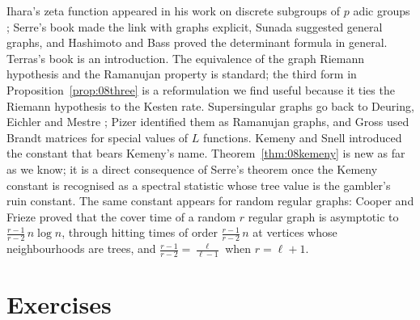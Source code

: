 Ihara's zeta function appeared in his work on discrete subgroups of $p$ adic groups \cite{ihara1966}; Serre's book \cite{serre1980} made the link with graphs explicit, Sunada \cite{sunada1986} suggested general graphs, and Hashimoto \cite{hashimoto1989} and Bass \cite{bass1992} proved the determinant formula in general. Terras's book \cite{terras2011} is an introduction. The equivalence of the graph Riemann hypothesis and the Ramanujan property is standard; the third form in Proposition~\ref{prop:08three} is a reformulation we find useful because it ties the Riemann hypothesis to the Kesten rate. Supersingular graphs go back to Deuring, Eichler and Mestre \cite{mestre1986}; Pizer \cite{pizer1990} identified them as Ramanujan graphs, and Gross \cite{gross1987} used Brandt matrices for special values of $L$ functions. Kemeny and Snell \cite{kemenysnell1960} introduced the constant that bears Kemeny's name. Theorem~\ref{thm:08kemeny} is new as far as we know; it is a direct consequence of Serre's theorem once the Kemeny constant is recognised as a spectral statistic whose tree value is the gambler's ruin constant. The same constant appears for random regular graphs: Cooper and Frieze \cite{cooperfrieze2005} proved that the cover time of a random $r$ regular graph is asymptotic to $\frac{r-1}{r-2}\,n\log n$, through hitting times of order $\frac{r-1}{r-2}\,n$ at vertices whose neighbourhoods are trees, and $\frac{r-1}{r-2}=\frac{\ell}{\ell-1}$ when $r=\ell+1$.

\section{Exercises}

